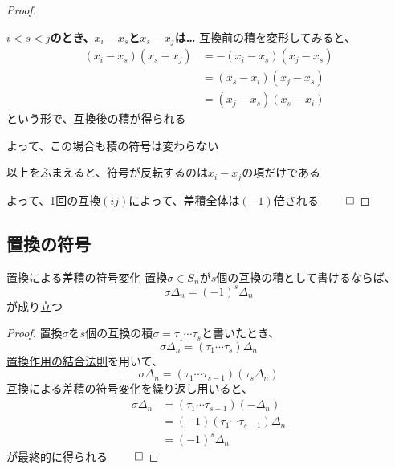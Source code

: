 \documentclass[../../../topic_linear-algebra]{subfiles}
\begin{document}
\begin{proof}
\begin{subpattern}{\bfseries $i < s < j$のとき、$x_i - x_s$と$x_s - x_j$は…}
    互換前の積を変形してみると、
    \begin{align*}
      (x_i - x_s)(x_s - x_j) & = -(x_i - x_s)(x_j - x_s) \\
                             & = (x_s - x_i)(x_j - x_s)  \\
                             & = (x_j - x_s)(x_s - x_i)
    \end{align*}
    という形で、互換後の積が得られる

    よって、この場合も積の符号は変わらない
  \end{subpattern}

  以上をふまえると、符号が反転するのは$x_i - x_j$の項だけである

  よって、1回の互換$(ij)$によって、差積全体は$(-1)$倍される $\qed$
\end{proof}

\subsection{置換の符号}

\begin{theorem*}{置換による差積の符号変化}
  置換$\sigma \in S_n$が$s$個の互換の積として書けるならば、
  \begin{equation*}
    \sigma \Delta_n = (-1)^s \Delta_n
  \end{equation*}
  が成り立つ
\end{theorem*}

\begin{proof}
  置換$\sigma$を$s$個の互換の積$\sigma = \tau_1 \cdots \tau_s$と書いたとき、
  \begin{equation*}
    \sigma \Delta_n = (\tau_1 \cdots \tau_s) \Delta_n
  \end{equation*}
  \hyperref[thm:permutation-action-associativity]{置換作用の結合法則}を用いて、
  \begin{equation*}
    \sigma \Delta_n = (\tau_1 \cdots \tau_{s-1}) (\tau_s \Delta_n)
  \end{equation*}
  \hyperref[thm:transposition-negates-delta]{互換による差積の符号変化}を繰り返し用いると、
  \begin{align*}
    \sigma \Delta_n & = (\tau_1 \cdots \tau_{s-1}) (-\Delta_n)  \\
                    & = (-1)(\tau_1 \cdots \tau_{s-1}) \Delta_n \\
                    & = (-1)^s \Delta_n
  \end{align*}
  が最終的に得られる $\qed$
\end{proof}
\end{document}
